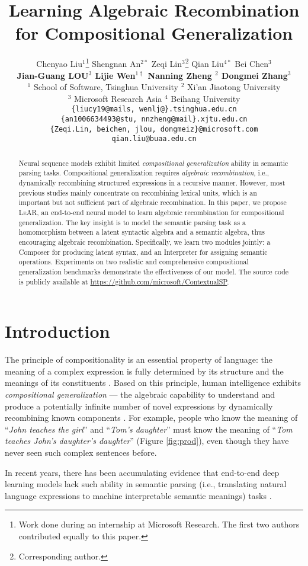 \documentclass[11pt,a4paper]{article}
\title{Learning Algebraic Recombination for Compositional Generalization}
\author{
  Chenyao Liu$^{1}$\thanks{\quad Work done during an internship at Microsoft Research. The first two authors contributed equally to this paper.} \quad Shengnan An$^{2*}$ \quad Zeqi Lin$^{3}$\thanks{\quad Corresponding author.} \quad Qian Liu$^{4*}$ \quad Bei Chen$^3$ \\
  \textbf{ \quad Jian-Guang LOU$^3$  \quad Lijie Wen$^{1\dagger}$ \quad Nanning Zheng $^2$ \quad Dongmei Zhang$^3$}\\
  
  $^1$ School of Software, Tsinghua University \quad $^2$ Xi'an Jiaotong University\\
  $^3$ Microsoft Research Asia \quad $^4$ Beihang University\\
  \texttt{\{liucy19@mails, wenlj@\}.tsinghua.edu.cn} \\
  \texttt{\{an1006634493@stu, nnzheng@mail\}.xjtu.edu.cn} \\
  \texttt{\{Zeqi.Lin, beichen, jlou, dongmeiz\}@microsoft.com} \\
  \texttt{qian.liu@buaa.edu.cn} 
}
\date{}
\begin{document}
\maketitle
\begin{abstract}
Neural sequence models exhibit limited \emph{compositional generalization} ability in semantic parsing tasks. Compositional generalization requires \emph{algebraic recombination}, i.e., dynamically recombining structured expressions in a recursive manner.
However, most previous studies mainly concentrate on recombining lexical units, which is an important but not sufficient part of algebraic recombination.
In this paper, we propose \textsc{LeAR}, an end-to-end neural model to learn algebraic recombination for compositional generalization.
The key insight is to model the semantic parsing task as a homomorphism between a latent syntactic algebra and a semantic algebra, thus encouraging algebraic recombination.
Specifically, we learn two modules jointly: a Composer for producing latent syntax, and an Interpreter for assigning semantic operations.
Experiments on two realistic and comprehensive compositional generalization benchmarks demonstrate the effectiveness of our model.
The source code is publicly available at \href{https://github.com/microsoft/ContextualSP}{https://github.com/microsoft/ContextualSP}.
\end{abstract}

\section{Introduction}

The principle of compositionality is an essential property of language: the meaning of a complex expression is fully determined by its structure and the meanings of its constituents \cite{pelletier2003context-tpoc, szabo2004compositionality-tpoc}.
Based on this principle, human intelligence exhibits \textit{compositional generalization} --- the algebraic capability to understand and produce a potentially infinite number of novel expressions by dynamically recombining known components \cite{chomsky1957syntactic-hicg, fodor_connectionism_1988-hicg, fodor2002compositionality-hicg}.
For example, people who know the meaning of ``\textit{John teaches the girl}'' and ``\textit{Tom's daughter}'' must know the meaning of
``\textit{Tom teaches John's daughter's daughter}'' (Figure \ref{fig:prod}), even though they have never seen such complex sentences before.

In recent years, there has been accumulating evidence that end-to-end deep learning models lack such ability in semantic parsing (i.e., translating natural language expressions to machine interpretable semantic meanings) tasks \cite{lake2018scan, keysers2019measuring, kim2020cogs, tsarkov2020cfq-lcg}.
\end{document}
